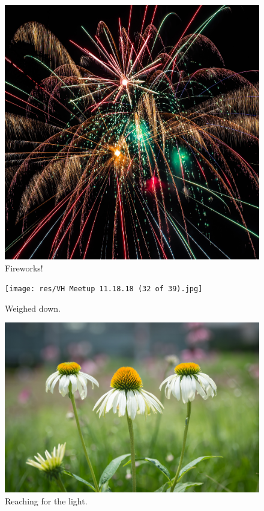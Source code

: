 \documentclass{report}
\begin{document}
\begin{figure}
  \includegraphics[width=\linewidth]{res/fireworks.jpg}
  \caption{Fireworks!}
\end{figure}

\begin{figure}
  \texttt{[image: res/VH Meetup 11.18.18 (32 of 39).jpg]}
  \caption{Weighed down.}
\end{figure}

\begin{figure}
  \includegraphics[width=\linewidth]{res/symmetricalflowers.jpg}
  \caption{Reaching for the light.}
\end{figure}
\end{document}
